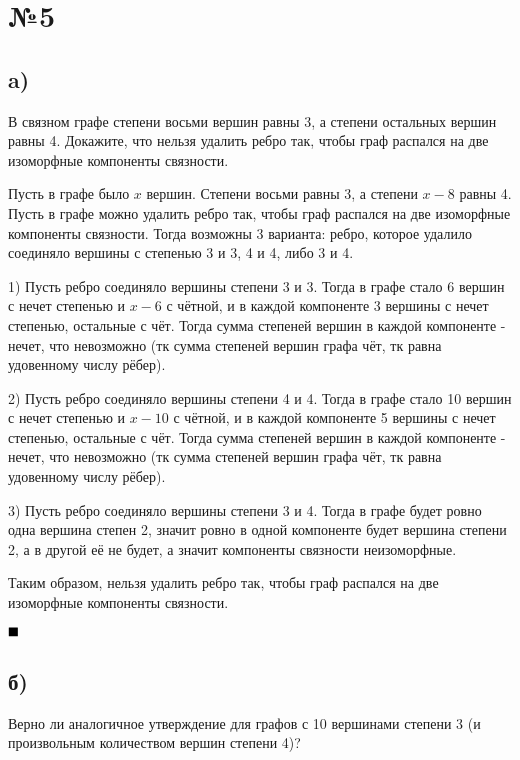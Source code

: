 \documentclass[a4paper, 16pt]{article}
\newenvironment{proof}[1][Доказательство]{%
	\begin{trivlist}
		\item[\hskip \labelsep {\bfseries #1:}]
		\item \hspace{14pt}
	}{
		$ \hfill\blacksquare $
	\end{trivlist}
	\hfill\break
}
\begin{document}
	\section*{№5}
	
		\subsection*{a)}
		
			В связном графе степени восьми вершин равны 3, а степени остальных вершин равны 4. Докажите,
			что нельзя удалить ребро так, чтобы граф распался на две изоморфные компоненты связности.
			
			\begin{proof}
				Пусть в графе было $x$ вершин. Степени восьми равны 3, а степени $x - 8$ равны 4. Пусть в графе можно удалить ребро так, чтобы граф распался на две изоморфные компоненты связности. Тогда возможны 3 варианта: ребро, которое удалило соединяло вершины с степенью 3 и 3, 4 и 4, либо 3 и 4.
				
				1) Пусть ребро соединяло вершины степени 3 и 3. Тогда в графе стало 6 вершин с нечет степенью и $x - 6$ с чётной, и в каждой компоненте 3 вершины с нечет степенью, остальные с чёт. Тогда сумма степеней вершин в каждой компоненте - нечет, что невозможно (тк сумма степеней вершин графа чёт, тк равна удовенному числу рёбер).
				
				2) Пусть ребро соединяло вершины степени 4 и 4. Тогда в графе стало 10 вершин с нечет степенью и $x - 10$ с чётной, и в каждой компоненте 5 вершины с нечет степенью, остальные с чёт. Тогда сумма степеней вершин в каждой компоненте - нечет, что невозможно (тк сумма степеней вершин графа чёт, тк равна удовенному числу рёбер).
				
				3) Пусть ребро соединяло вершины степени 3 и 4. Тогда в графе будет ровно одна вершина степен 2, значит ровно в одной компоненте будет вершина степени 2, а в другой её не будет, а значит компоненты связности неизоморфные.
				
				Таким образом, нельзя удалить ребро так, чтобы граф распался на две изоморфные компоненты связности.
			\end{proof}
		
		\subsection*{б)}
			Верно ли аналогичное утверждение для графов с 10 вершинами степени 3 (и произвольным количеством вершин степени 4)?
			
\end{document}
